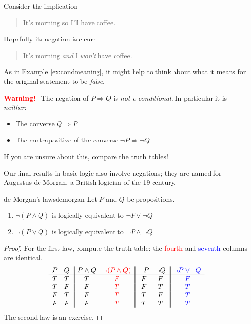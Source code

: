 \vspace{-5pt}


\goodbreak


\begin{example}{}{}
	Consider the implication
	\begin{quote}
	  It's morning so I'll have coffee.
	\end{quote}
	Hopefully its negation is clear:
	\begin{quote}
	  It's morning \emph{and} I \emph{won't} have coffee.
	\end{quote}
	As in Example \ref{ex:condmeaning}, it might help to think about what it means for the original statement to be \emph{false}.
\end{example}

\begin{tcolorbox}
	{\bf \textcolor{red}{Warning!}} \ The negation of $P\Longrightarrow Q$ is \emph{not a conditional.} In particular it is \emph{neither}:
	\begin{itemize}\itemsep2pt
	  \item The converse $Q\Longrightarrow P$
	  \item The contrapositive of the converse $\neg P\Longrightarrow\neg Q$
	\end{itemize}
	If you are unsure about this, compare the truth tables!
\end{tcolorbox}

\bigbreak


Our final results in basic logic also involve negations; they are named for Augustus de Morgan, a British logician of the 19\th{} century.

\begin{thm}{de Morgan's laws}{demorgan}
	Let $P$ and $Q$ be propositions.
	\begin{enumerate}\itemsep2pt
	  \item $\neg(P\wedge Q)$ is logically equivalent to $\neg P\vee\neg Q$
	  \item $\neg(P\vee Q)$ is logically equivalent to $\neg P\wedge\neg Q$
	\end{enumerate}
\end{thm}

\begin{proof}
	For the first law, compute the truth table: the \textcolor{red}{fourth} and \textcolor{blue}{seventh} columns are identical.
	\[
		\begin{array}[t]{cc||cc||cc||c}
			P & Q & P\wedge Q & \textcolor{red}{\neg(P\wedge Q)} & \neg P & \neg Q & \textcolor{blue}{\neg P\vee\neg Q}\\\hline
			T & T & T & \textcolor{red}{F} & F & F & \textcolor{blue}{F}\\
			T & F & F & \textcolor{red}{T} & F & T & \textcolor{blue}{T}\\
			F & T & F & \textcolor{red}{T} & T & F & \textcolor{blue}{T}\\
			F & F & F & \textcolor{red}{T} & T & T & \textcolor{blue}{T}
		\end{array}
	\]
	The second law is an exercise.
\end{proof}

